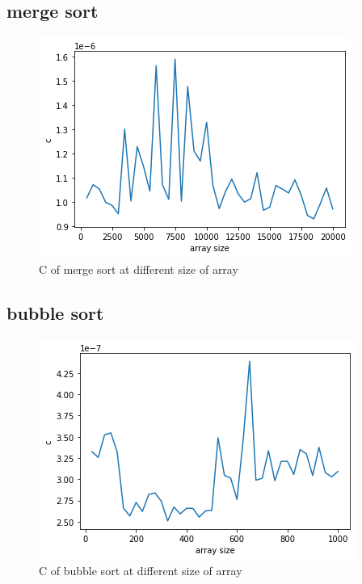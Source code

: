 \documentclass{article}
\begin{document}
\subsection{merge sort}
\begin{figure}[H]
    \centering
    \includegraphics[scale=0.7]{mergeresult2.png}
    \caption{C of merge sort at different size of array}
\end{figure}
\subsection{bubble sort}
\begin{figure}[H]
    \centering
    \includegraphics[scale=0.7]{bubbleresult2.png}
    \caption{C of bubble sort at different size of array}
\end{figure}
\end{document}
